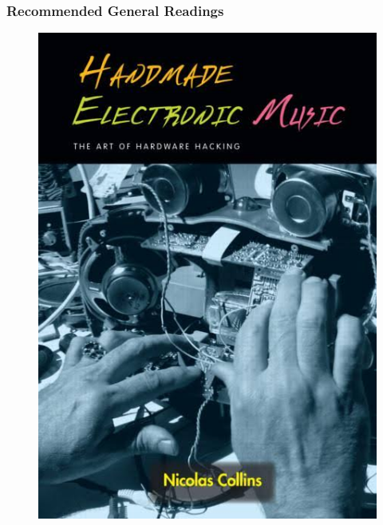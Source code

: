 \documentclass[screen, aspectratio=43]{beamer}
\begin{document}
\begin{frame}
\frametitle{Recommended General Readings}
\begin{figure}
\includegraphics[scale=0.14]{img/HEM-collins-book.jpg}

\end{figure}
\end{frame}
\end{document}
